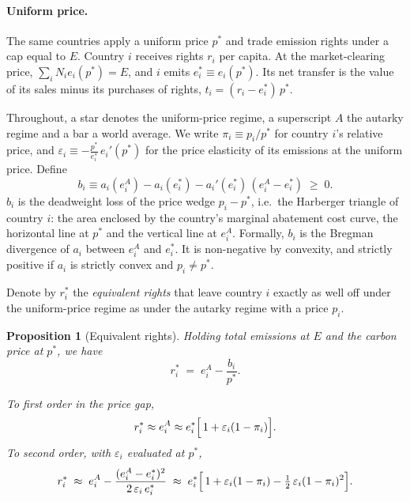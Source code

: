 \documentclass[12pt,english]{article}
\newtheorem{proposition}{Proposition}
\theoremstyle{remark}
\begin{document}
\paragraph{Uniform price.} The same countries apply a uniform price $p^*$ and trade emission rights under a cap equal to $E$.
Country $i$ receives rights $r_i$ per capita. At the market-clearing price, $\sum_i N_i e_i(p^*) = E$,
and $i$ emits $e^*_i \equiv e_i(p^*)$. Its net transfer is the value of its sales minus its purchases of rights, $t_i=(r_i-e^*_i)\,p^*$.

Throughout, a star denotes the uniform-price regime, a superscript $A$ the autarky regime and a bar a world average.
We write $\pi_i \equiv p_i/p^*$ for country $i$'s relative price, and $\varepsilon_i \equiv -\frac{p^*}{e^*_i}\,e_i'(p^*)$ for the price elasticity of its emissions at the uniform price. Define
\begin{equation}
  b_i \equiv a_i(e^A_i) - a_i(e^*_i) - a_i'(e^*_i)\,(e^A_i-e^*_i) \;\geq\; 0.
  \label{eq:bregman}
\end{equation}
$b_i$ is the deadweight loss of the price wedge $p_i - p^*$, i.e.\ the Harberger triangle of country $i$:
the area enclosed by the country's marginal abatement cost curve, the horizontal line at $p^*$ and the vertical line at $e^A_i$.
Formally, $b_i$ is the Bregman divergence of $a_i$ between $e^A_i$ and $e^*_i$. It is non-negative by convexity, and strictly positive if $a_i$ is strictly convex and $p_i\neq p^*$.

Denote by $r^*_i$ the \textit{equivalent rights} that leave country $i$ exactly as well off under the uniform-price regime as under the autarky regime with a price $p_i$.
\begin{proposition}[Equivalent rights]\label{prop:equiv}
Holding total emissions at $E$ and the carbon price at $p^*$, we have
\begin{equation}
  r^*_i \;=\; e^A_i - \frac{b_i}{p^*}.
  \label{eq:req_exact}
\end{equation}

To first order in the price gap,
\begin{equation}
  r^*_i \approx e^A_i \approx e^*_i\Bigl[\,1+\varepsilon_i(1-\pi_i)\Bigr].
    \label{eq:req_first}
\end{equation}
To second order, with $\varepsilon_i$ evaluated at $p^*$,
\begin{equation}
  r^*_i \;\approx\; e^A_i - \frac{(e^A_i-e^*_i)^2}{2\,\varepsilon_i\,e^*_i}
  \;\approx\; e^*_i\Bigl[\,1+\varepsilon_i(1-\pi_i)-\tfrac12\,\varepsilon_i(1-\pi_i)^2\Bigr].
  \label{eq:req_second}
\end{equation}
\end{proposition}
\end{document}
